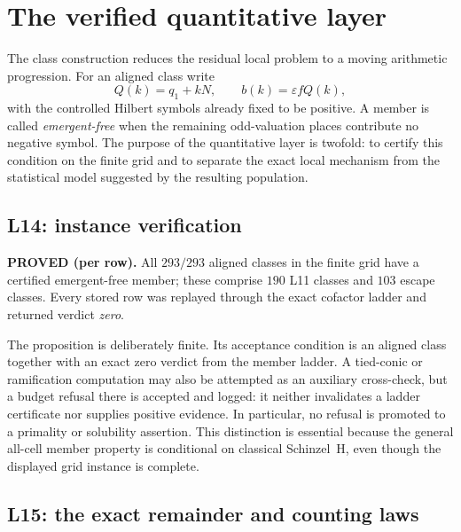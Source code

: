 \section{The verified quantitative layer}
\label{sec:sieve}

The class construction reduces the residual local problem to a moving
arithmetic progression.  For an aligned class write
\[
 Q(k)=q_1+kN,\qquad b(k)=\varepsilon fQ(k),
\]
with the controlled Hilbert symbols already fixed to be positive.  A
member is called \emph{emergent-free} when the remaining odd-valuation
places contribute no negative symbol.  The purpose of the quantitative
layer is twofold: to certify this condition on the finite grid and to
separate the exact local mechanism from the statistical model suggested
by the resulting population.

\subsection{L14: instance verification}

\begin{proposition}
\textbf{PROVED (per row).}  All $293/293$ aligned classes in the
finite grid have a certified emergent-free member; these comprise $190$
L11 classes and $103$ escape classes.  Every stored row was replayed
through the exact cofactor ladder and returned verdict \emph{zero}.
\end{proposition}

The proposition is deliberately finite.  Its acceptance condition is
an aligned class together with an exact zero verdict from the member
ladder.  A tied-conic or ramification computation may also be attempted
as an auxiliary cross-check, but a budget refusal there is accepted and
logged: it neither invalidates a ladder certificate nor supplies
positive evidence.  In particular, no refusal is promoted to a
primality or solubility assertion.  This distinction is essential
because the general all-cell member property is conditional on classical
Schinzel~H, even though the displayed grid instance is complete.

\subsection{L15: the exact remainder and counting laws}

